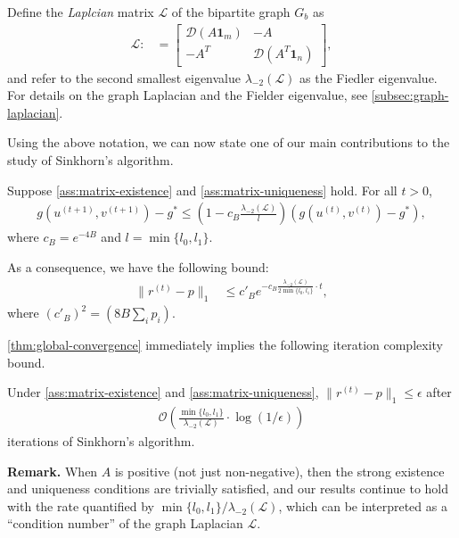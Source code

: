 Define the \emph{Laplcian} matrix $\mathcal{L}$ of the bipartite graph $G_b$ as 
\begin{align*}
\mathcal{L}:&=\begin{bmatrix}\mathcal{D}({A}\mathbf{1}_{m}) & -{A}\\
-{A}^{T} & \mathcal{D}({A}^{T}\mathbf{1}_{n})
\end{bmatrix}, 
\end{align*}
and refer to the second smallest eigenvalue $\lambda_{-2}(\mathcal{L})$ as the Fiedler eigenvalue. For details on the graph Laplacian and the Fielder eigenvalue, see \cref{subsec:graph-laplacian}.

Using the above notation, we can now state one of our main contributions to the study of Sinkhorn's algorithm. 
\begin{theorem}
\label{thm:global-convergence}
Suppose \cref{ass:matrix-existence} and \cref{ass:matrix-uniqueness} hold. For all $t>0$,
\begin{align}
\label{eq:potential convergence}
g(u^{(t+1)},v^{(t+1)}) - g^\ast \leq (1-c_B \frac{\lambda_{-2}(\mathcal{L})} {l})\left( g(u^{(t)},v^{(t)})-g^\ast \right),
    \end{align}
    where $c_B=e^{-4B}$ and $l=\min\{l_0,l_1\}$.
      
    As a consequence, we have the following bound:
    \begin{align*}
       \|r^{(t)}-p\|_{1} &\leq c'_Be^{-c_{B}\frac{\lambda_{-2}(\mathcal{L})}{2\min\{l_{0},l_{1}\}}\cdot t},
    \end{align*} 
    where $(c'_B)^2=(8B\sum_{i}p_{i})$.
\end{theorem}
\cref{thm:global-convergence} immediately implies the following iteration complexity bound.
\begin{corollary}
Under \cref{ass:matrix-existence} and \cref{ass:matrix-uniqueness}, $\|r^{(t)}-p\|_1\leq \epsilon$ after
      \begin{align*}
          \mathcal{O} \left (\frac{\min\{l_{0},l_{1}\}}{\lambda_{-2}(\mathcal{L})} \cdot \log (1/\epsilon) \right )
      \end{align*}
       iterations of Sinkhorn's algorithm.
\end{corollary}
\textbf{Remark.} When $A$ is positive (not just non-negative), then the strong existence and uniqueness conditions are trivially satisfied, and our results continue to hold with the rate quantified by $\min\{l_{0},l_{1}\}/\lambda_{-2}(\mathcal{L})$, which can be interpreted as a ``condition number'' of the graph Laplacian $\mathcal{L}$.


